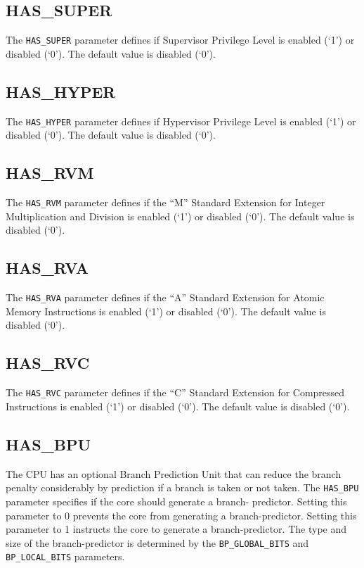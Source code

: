 \subsection{HAS\_SUPER}\label{has_super}

The \texttt{HAS\_SUPER} parameter defines if Supervisor Privilege Level is
enabled (`1') or disabled (`0'). The default value is disabled (`0').

\subsection{HAS\_HYPER}\label{has_hyper}

The \texttt{HAS\_HYPER} parameter defines if Hypervisor Privilege Level is
enabled (`1') or disabled (`0'). The default value is disabled (`0').

\subsection{HAS\_RVM}\label{has_rvm}

The \texttt{HAS\_RVM} parameter defines if the ``M'' Standard Extension for
Integer Multiplication and Division is enabled (`1') or disabled (`0').
The default value is disabled (`0').

\subsection{HAS\_RVA}\label{HAS_RVA}

The \texttt{HAS\_RVA} parameter defines if the ``A'' Standard Extension for
Atomic Memory Instructions is enabled (`1') or disabled (`0'). The
default value is disabled (`0').

\subsection{HAS\_RVC}\label{has_rvc}

The \texttt{HAS\_RVC} parameter defines if the ``C'' Standard Extension for
Compressed Instructions is enabled (`1') or disabled (`0'). The default
value is disabled (`0').

\subsection{HAS\_BPU}\label{has_bpu}

The CPU has an optional Branch Prediction Unit that can reduce the branch
penalty considerably by prediction if a branch is taken or not taken. The
\texttt{HAS\_BPU} parameter specifies if the core should generate a branch-
predictor. Setting this parameter to 0 prevents the core from generating a
branch-predictor. Setting this parameter to 1 instructs the core to generate a
branch-predictor. The type and size of the branch-predictor is determined by the
\texttt{BP\_GLOBAL\_BITS} and \texttt{BP\_LOCAL\_BITS} parameters.

